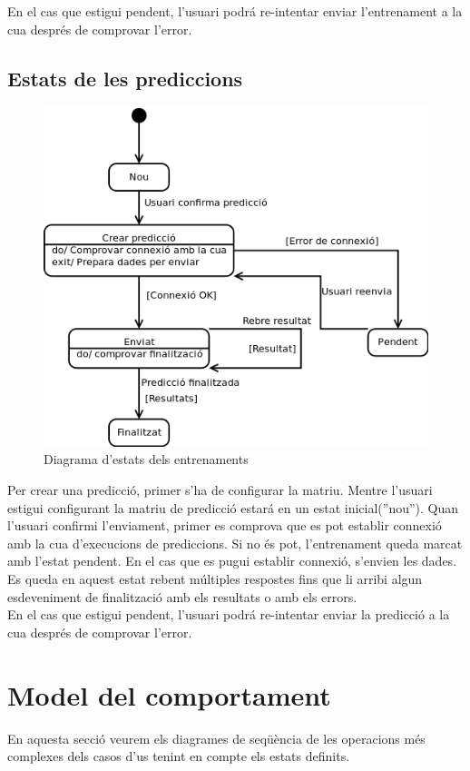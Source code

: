 En el cas que estigui pendent, l'usuari podr\'{a} re-intentar enviar l'entrenament a la cua despr\'{e}s de comprovar l'error.

\subsection{Estats de les prediccions}
\begin{figure}[H]
  \centering
  \includegraphics[scale=0.4]{img/specification/StatesPrediction.png}
  \caption{Diagrama d'estats dels entrenaments}
  \label{fig:statestraining}
\end{figure}
Per crear una predicci\'{o}, primer s'ha de configurar la matriu. Mentre l'usuari estigui configurant la matriu de predicci\'{o} estar\'{a} en un estat inicial(''nou''). Quan l'usuari confirmi l'enviament, primer es comprova que es pot establir connexi\'{o} amb la cua d'execucions de prediccions. Si no \'{e}s pot, l'entrenament queda marcat amb l'estat pendent. En el cas que es pugui establir connexi\'{o}, s'envien les dades. Es queda en aquest estat rebent múltiples respostes fins que li arribi algun esdeveniment de finalitzaci\'{o} amb els resultats o amb els errors.\\
En el cas que estigui pendent, l'usuari podr\'{a} re-intentar enviar la predicci\'{o} a la cua despr\'{e}s de comprovar l'error.

\section{Model del comportament}
En aquesta secci\'{o} veurem els diagrames de seqüència de les operacions m\'{e}s complexes dels casos d'us tenint en compte els estats definits.

